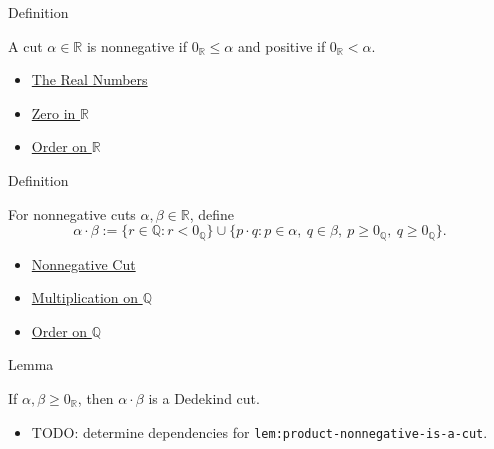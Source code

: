 \begin{definitionbox}{Definition}
\begin{definition}
\label{def:nonnegative-cut}
A cut $\alpha\in\mathbb{R}$ is nonnegative if $0_{\mathbb{R}}\le\alpha$ and
positive if $0_{\mathbb{R}}<\alpha$.
\end{definition}
\end{definitionbox}

\begin{dependencies}
\begin{itemize}
  \item \hyperref[def:reals]{The Real Numbers}
  \item \hyperref[def:zero-in-r]{Zero in $\mathbb{R}$}
  \item \hyperref[def:order-on-r]{Order on $\mathbb{R}$}
\end{itemize}
\end{dependencies}

\begin{definitionbox}{Definition}
\begin{definition}
\label{def:product-nonnegative-on-r}
For nonnegative cuts $\alpha,\beta\in\mathbb{R}$, define
\[
\alpha\cdot\beta
:=
\{r\in\mathbb{Q}:r<0_{\mathbb{Q}}\}
\cup
\{p\cdot q:p\in\alpha,\ q\in\beta,\ p\ge 0_{\mathbb{Q}},\ q\ge 0_{\mathbb{Q}}\}.
\]
\end{definition}
\end{definitionbox}

\begin{dependencies}
\begin{itemize}
  \item \hyperref[def:nonnegative-cut]{Nonnegative Cut}
  \item \hyperref[def:multiplication-on-q-classes]{Multiplication on $\mathbb{Q}$}
  \item \hyperref[def:order-on-q]{Order on $\mathbb{Q}$}
\end{itemize}
\end{dependencies}

\begin{lemmabox}{Lemma}
\begin{lemma}
\label{lem:product-nonnegative-is-a-cut}
If $\alpha,\beta\ge 0_{\mathbb{R}}$, then $\alpha\cdot\beta$ is a Dedekind cut.
\end{lemma}
\end{lemmabox}

\begin{dependencies}
\begin{itemize}
  \item TODO: determine dependencies for \texttt{lem:product-nonnegative-is-a-cut}.
\end{itemize}
\end{dependencies}

